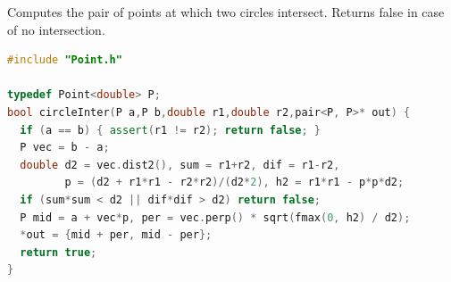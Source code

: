 Computes the pair of points at which two circles intersect. Returns false in case of no intersection.
\begin{lstlisting}[style=codebook, language=C++]
#include "Point.h"

typedef Point<double> P;
bool circleInter(P a,P b,double r1,double r2,pair<P, P>* out) {
  if (a == b) { assert(r1 != r2); return false; }
  P vec = b - a;
  double d2 = vec.dist2(), sum = r1+r2, dif = r1-r2,
         p = (d2 + r1*r1 - r2*r2)/(d2*2), h2 = r1*r1 - p*p*d2;
  if (sum*sum < d2 || dif*dif > d2) return false;
  P mid = a + vec*p, per = vec.perp() * sqrt(fmax(0, h2) / d2);
  *out = {mid + per, mid - per};
  return true;
}
\end{lstlisting}
